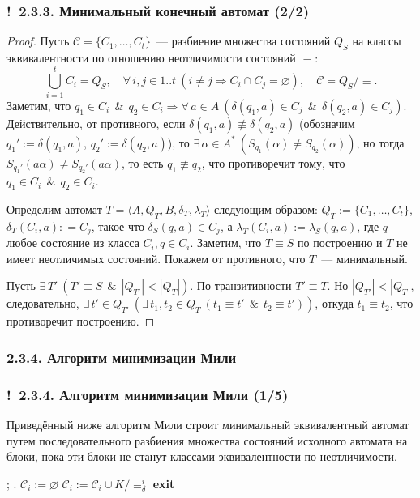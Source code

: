 \documentclass[mathserif,12pt,aspectratio=169]{beamer}
\let\emptyset\varnothing
\def\Assign{\operatorname{:=}}
\def\A#1#2{\forall\,#1\ \left(#2\right)}
\def\E#1#2{\exists\,#1\ \left(#2\right)}
\let\Impl\Longrightarrow
\def\And{\operatorname{\,\&\,}}
\def\Ok{{\color{green}\textbf{!}\ }}
\begin{document}
\begin{frame}
\frametitle{\Ok 2.3.3. Минимальный конечный автомат (2/2)}
\begin{proof}
Пусть $\mathcal{C}=\{C_1,\dots, C_t\}$~--- разбиение множества
состояний $Q_S$ на классы эквивалентности по отношению
неотличимости состояний $\equiv$:
$$
\bigcup_{i=1}^t C_i = Q_S,\quad
\A{i,j \in 1..t}{ i\neq j \Impl C_i\cap C_j = \emptyset}, \quad
\mathcal{C}=Q_S/\equiv.
$$
Заметим, что
$q_1\in C_i \And q_2 \in C_i \Impl \A{a \in A}{\delta(q_1, a)\in
C_j \And \delta(q_2, a)\in C_j}$. Действитель\-но, от противного,
если $\delta(q_1,a)\not\equiv\delta(q_2,a)$ (обозначим
$q_1':=\delta(q_1,a)$, $q_2':= \delta(q_2,a)$), то
$\E{\alpha\in A^*}{S_{q_1}(\alpha)\neq S_{q_2}(\alpha)}$, но
тогда $S_{q_1'}(a\alpha)\neq S_{q_2'}(a\alpha)$, то есть $q_1
\not\equiv q_2$, что противоречит тому, что
$q_1 \in C_i \And q_2\in C_i$.

Определим автомат $T =\langle A, Q_{T}, B, \delta_{T},
\lambda_{T}\rangle$ следующим образом: $Q_{T}:= \{C_1, \dots,
C_t\}$, $\delta_{T}(C_i, a): = C_j$, такое что $\delta_S(q,a)\in
C_j$, а $\lambda_{T}(C_i, a)\Assign \lambda_S(q,a)$, где $q$~---
любое состояние из класса $C_i, q\in C_i$. Заметим, что $T\equiv
S$ по построению и $T$ не имеет неотличимых состояний. Покажем от
противного, что $T$~--- минимальный.

Пусть $\E{T'}{T'\equiv S \And |Q_{T'}|< |Q_{T}|}$. По
транзитивности $T'\equiv T$. Но $|Q_{T'}|< |Q_{T}|$, следовательно,
$\E{t'\in Q_{T'}}{\E{t_1, t_2\in Q_{T}}{t_1\equiv t'\And t_2\equiv
t'}}$, откуда $t_1\equiv t_2$, что противоречит построению.
\end{proof}

\end{frame}


\subsubsection{2.3.4. Алгоритм минимизации Мили}\label{2.3.4.}
\begin{frame}
\frametitle{\Ok 2.3.4. Алгоритм минимизации Мили (1/5)}
Приведённый ниже алгоритм Мили строит минимальный эквивалентный автомат
путем последовательного разбиения множества состояний исходного
автомата на блоки, пока эти блоки не станут классами эквивалентности
по неотличимости.

\begin{algorithmic}
;
.
 \STATE $\mathcal{C}_i\Assign\emptyset$
  \STATE $\mathcal{C}_i\Assign\mathcal{C}_i 
  \cup K/ \equiv_\delta^i$
 \ENDFOR
   \STATE \textbf{ exit }
 \ENDIF
\ENDFOR
\end{algorithmic}
\end{frame}
\end{document}
